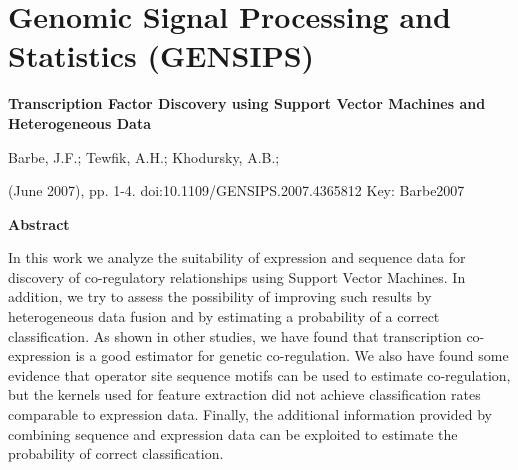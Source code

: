 \chapter{Genomic Signal Processing and Statistics (GENSIPS)}


{\Large \bf Transcription Factor Discovery using Support Vector Machines and Heterogeneous Data}

Barbe, J.F.;   Tewfik, A.H.;   Khodursky, A.B.;  

(June 2007), pp. 1-4. doi:10.1109/GENSIPS.2007.4365812 Key: Barbe2007

{\large \bf Abstract}

In this work we analyze the suitability of expression and sequence data for discovery of co-regulatory relationships using Support Vector Machines. In addition, we try to assess the possibility of improving such results by heterogeneous data fusion and by estimating a probability of a correct classification. As shown in other studies, we have found that transcription co-expression is a good estimator for genetic co-regulation. We also have found some evidence that operator site sequence motifs can be used to estimate co-regulation, but the kernels used for feature extraction did not achieve classification rates comparable to expression data. Finally, the additional information provided by combining sequence and expression data can be exploited to estimate the probability of correct classification.
